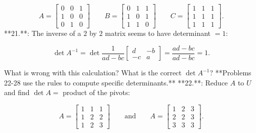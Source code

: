 \[A=\begin{bmatrix}0&0&1\\ 1&0&0\\ 0&1&0\end{bmatrix}\qquad B=\begin{bmatrix}0&1&1\\ 1&0&1\\ 1&1&0\end{bmatrix}\qquad C=\begin{bmatrix}1&1&1\\ 1&1&1\\ 1&1&1\end{bmatrix}.\]
**21.**: The inverse of a \(2\) by \(2\) matrix seems to have determinant \(=1\):

\[\det A^{-1}=\det\frac{1}{ad-bc}\begin{bmatrix}d&-b\\ -c&a\end{bmatrix}=\frac{ad-bc}{ad-bc}=1.\]

What is wrong with this calculation? What is the correct \(\det A^{-1}\)?
**Problems 22-28 use the rules to compute specific determinants.**
**22.**: Reduce \(A\) to \(U\) and find \(\det A=\) product of the pivots:

\[A=\begin{bmatrix}1&1&1\\ 1&2&2\\ 1&2&3\end{bmatrix}\qquad\text{and}\qquad A=\begin{bmatrix}1&2&3\\ 2&2&3\\ 3&3&3\end{bmatrix}.\]